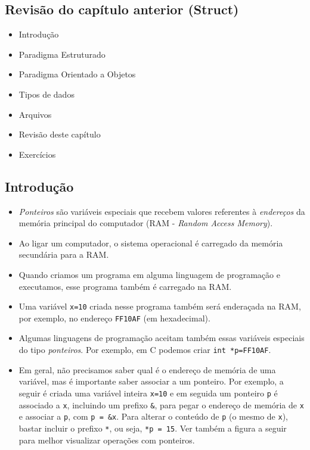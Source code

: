 \documentclass[12pt,a4paper]{article}
\providecommand{\tightlist}{%
      \setlength{\itemsep}{0pt}\setlength{\parskip}{0pt}}
\begin{document}
    \hypertarget{revisuxe3o-do-capuxedtulo-anterior-struct}{%
\subsection{Revisão do capítulo anterior
(Struct)}\label{revisuxe3o-do-capuxedtulo-anterior-struct}}

    \begin{itemize}
\tightlist
\item
  Introdução
\item
  Paradigma Estruturado
\item
  Paradigma Orientado a Objetos
\item
  Tipos de dados
\item
  Arquivos
\item
  Revisão deste capítulo
\item
  Exercícios
\end{itemize}

    \hypertarget{introduuxe7uxe3o}{%
\subsection{Introdução}\label{introduuxe7uxe3o}}

    \begin{itemize}
\item
  \emph{Ponteiros} são variáveis especiais que recebem valores
  referentes à \emph{endereços} da memória principal do computador (RAM
  - \emph{Random Access Memory}).
\item
  Ao ligar um computador, o sistema operacional é carregado da memória
  secundária para a RAM.
\item
  Quando criamos um programa em alguma linguagem de programação e
  executamos, esse programa também é carregado na RAM.
\item
  Uma variável \texttt{x=10} criada nesse programa também será
  enderaçada na RAM, por exemplo, no endereço \texttt{FF10AF} (em
  hexadecimal).
\item
  Algumas linguagens de programação aceitam também essas variáveis
  especiais do tipo \emph{ponteiros}. Por exemplo, em C podemos criar
  \texttt{int\ *p=FF10AF}.
\item
  Em geral, não precisamos saber qual é o endereço de memória de uma
  variável, mas é importante saber associar a um ponteiro. Por exemplo,
  a seguir é criada uma variável inteira \texttt{x=10} e em seguida um
  ponteiro \texttt{p} é associado a \texttt{x}, incluindo um prefixo
  \texttt{\&}, para pegar o endereço de memória de \texttt{x} e associar
  a \texttt{p}, com \texttt{p\ =\ \&x}. Para alterar o conteúdo de
  \texttt{p} (o mesmo de \texttt{x}), bastar incluir o prefixo
  \texttt{*}, ou seja, \texttt{*p\ =\ 15}. Ver também a figura a seguir
  para melhor visualizar operações com ponteiros.
\end{itemize}
\end{document}
